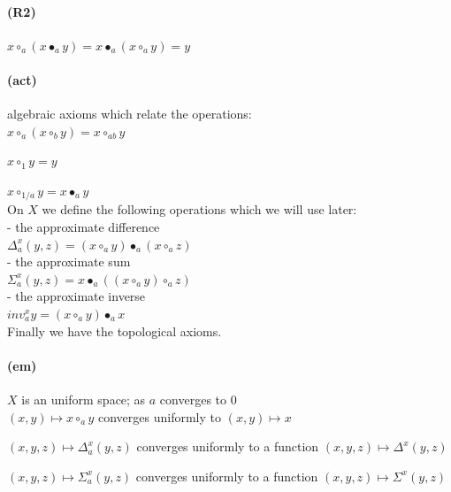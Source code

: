 \documentclass[]{article}
\let\oldparagraph\paragraph
\renewcommand{\paragraph}[1]{\oldparagraph{#1}\mbox{}}
\begin{document}
\paragraph{(R2)} $x \circ_a (x \bullet_a y) = x \bullet_a (x \circ_a y) = y$ \\
   


\paragraph{(act)} algebraic axioms which relate the operations: \\

      $x \circ_a ( x \circ_b y) = x \circ_{ab} y $
      
      $x \circ_1 y = y $
      
      $x \circ_{1/a} y = x \bullet_a y $\\


\noindent On $X$ we define the following operations which we will use later:\\ 

- the approximate difference \\  

$\Delta^{x}_{a} (y , z)  =  (x \circ_a y) \bullet_a (x \circ_a z) $\\ 

- the approximate sum \\  

$\Sigma^{x}_{a} (y, z) = x \bullet_{a} ( ( x \circ_{a} y) \circ_{a} z)$  \\ 

- the approximate inverse \\

$inv^{x}_{a} y = (x \circ_{a} y) \bullet_{a} x$ \\

\noindent Finally we have the topological axioms. 


\paragraph{(em)} $X$ is an uniform space; as $a$ converges to $0$ \\

     $(x,y) \mapsto x \circ_a y$ converges uniformly to  $(x,y) \mapsto x$  

     $(x,y,z) \mapsto \Delta^{x}_{a} (y , z)$ converges uniformly to a function $(x,y,z) \mapsto \Delta^{x} (y , z)$

      $(x,y,z) \mapsto \Sigma^{x}_{a} (y , z)$ converges uniformly to a function $(x,y,z) \mapsto \Sigma^{x} (y , z)$ \\
\end{document}
